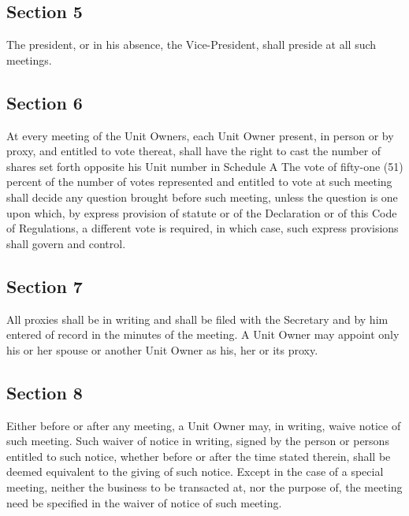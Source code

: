 \documentclass[
  14pt,
]{book}
\begin{document}
\hypertarget{section-5}{%
\subsection*{Section 5}\label{section-5}}

The president, or in his absence, the Vice-President, shall preside at all such meetings.

\hypertarget{section-6}{%
\subsection*{Section 6}\label{section-6}}

At every meeting of the Unit Owners, each Unit Owner present, in person or by proxy, and entitled to vote thereat, shall have the right to cast the number of shares set forth opposite his Unit number in Schedule A The vote of fifty-one (51) percent of the number of votes represented and entitled to vote at such meeting shall decide any question brought before such meeting, unless the question is one upon which, by express provision of statute or of the Declaration or of this Code of Regulations, a different vote is required, in which case, such express provisions shall govern and control.

\hypertarget{section-7}{%
\subsection*{Section 7}\label{section-7}}

All proxies shall be in writing and shall be filed with the Secretary and by him entered of record in the minutes of the meeting. A Unit Owner may appoint only his or her spouse or another Unit Owner as his, her or its proxy.

\hypertarget{section-8}{%
\subsection*{Section 8}\label{section-8}}

Either before or after any meeting, a Unit Owner may, in writing, waive notice of such meeting. Such waiver of notice in writing, signed by the person or persons entitled to such notice, whether before or after the time stated therein, shall be deemed equivalent to the giving of such notice. Except in the case of a special meeting, neither the business to be transacted at, nor the purpose of, the meeting need be specified in the waiver of notice of such meeting.
\end{document}
